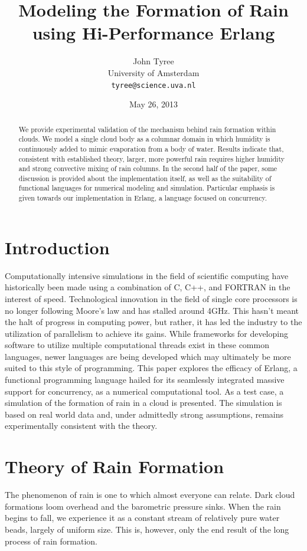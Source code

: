 \documentclass[twocolumn,a4paper,10pt]{article}
\title{Modeling the Formation of Rain using Hi-Performance Erlang}
\author{John Tyree\\
University of Amsterdam\\
\texttt{tyree@science.uva.nl}}
\date{May 26, 2013}
\begin{document}
\maketitle
\begin{abstract}
    We provide experimental validation of the mechanism behind rain formation
    within clouds. We model a single cloud body as a columnar domain in which
    humidity is continuously added to mimic evaporation from a body of water.
    Results indicate that, consistent with established theory, larger, more
    powerful rain requires higher humidity and strong convective mixing of rain
    columns.  In the second half of the paper, some discussion is provided about
    the implementation itself, as well as the suitability of functional
    languages for numerical modeling and simulation. Particular emphasis is
    given towards our implementation in Erlang, a language focused on
    concurrency.
\end{abstract}
\section{Introduction}

Computationally intensive simulations in the field of scientific computing have
historically been made using a combination of C, C++, and FORTRAN in the
interest of speed. Technological innovation in the field of single core
processors is no longer following Moore's law and has stalled around 4GHz. This
hasn't meant the halt of progress in computing power, but rather, it has led the
industry to the utilization of parallelism to achieve its gains. While
frameworks for developing software to utilize multiple computational threads
exist in these common languages, newer languages are being developed which may
ultimately be more suited to this style of programming. This paper explores the
efficacy of Erlang, a functional programming language hailed for its seamlessly
integrated massive support for concurrency, as a numerical computational tool.
As a test case, a simulation of the formation of rain in a cloud is presented.
The simulation is based on real world data and, under admittedly strong
assumptions, remains experimentally consistent with the theory.

\section{Theory of Rain Formation}
\label{sec:theory}

The phenomenon of rain is one to which almost everyone can relate. Dark cloud
formations loom overhead and the barometric pressure sinks. When the rain begins
to fall, we experience it as a constant stream of relatively pure water beads,
largely of uniform size. This is, however, only the end result of the long process of
rain formation.
\end{document}
